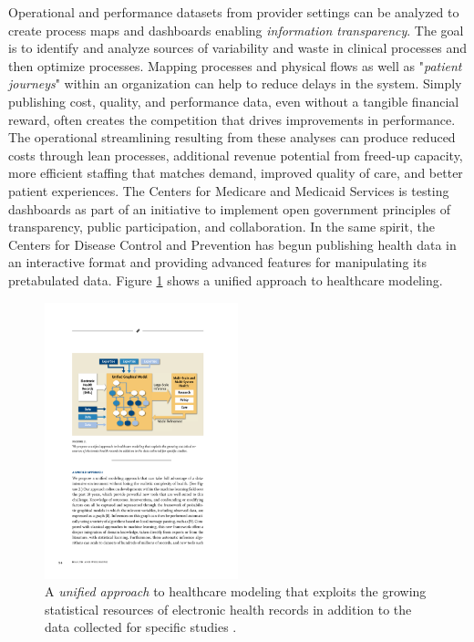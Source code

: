 \documentclass[twocolumn]{article}
\begin{document}
Operational and performance datasets from provider settings can be analyzed to create process maps and dashboards enabling \textit{information transparency}. The goal is to identify and analyze sources of variability and waste in clinical processes and then optimize processes. Mapping processes and physical flows as well as "\textit{patient journeys}" within an organization can help to reduce delays in the system. Simply publishing cost, quality, and performance data, even without a tangible financial reward, often creates the competition that drives improvements in performance. The operational streamlining resulting from these analyses can produce reduced costs through lean processes, additional revenue potential from freed-up capacity, more efficient staffing that matches demand, improved quality of care, and better patient experiences. The Centers for Medicare and Medicaid Services is testing dashboards as part of an initiative to implement open government principles of transparency, public participation, and collaboration. In the same spirit, the Centers for Disease Control and Prevention has begun publishing health data in an interactive format and providing advanced features for manipulating its pretabulated data. Figure \ref{fig:model} shows a unified approach to healthcare modeling.

\begin{figure}[htb]
        \centering
        \includegraphics[width=0.5\textwidth]{model.pdf}
        \caption{A \textit{unified approach} to healthcare modeling that exploits the growing statistical resources of electronic health records in addition to the data collected for specific studies \cite{Hey:2009}.}
        \label{fig:model}
\end{figure}
\end{document}
